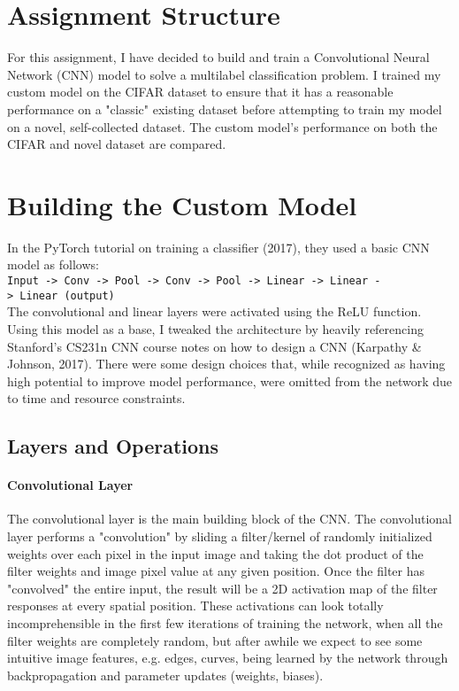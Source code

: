 \documentclass[11pt]{article}
\begin{document}
\newpage
    \section{Assignment Structure}\label{assignment-structure}

For this assignment, I have decided to build and train a Convolutional
Neural Network (CNN) model to solve a multilabel classification problem.
I trained my custom model on the CIFAR dataset to ensure that it has a
reasonable performance on a "classic" existing dataset before attempting
to train my model on a novel, self-collected dataset. The custom model's
performance on both the CIFAR and novel dataset are compared.

    \section{Building the Custom Model}\label{building-the-custom-model}

In the PyTorch tutorial on training a classifier (2017), they used a
basic CNN model as follows:\\

\texttt{Input\ -\textgreater{}\ Conv\ -\textgreater{}\ Pool\ -\textgreater{}\ Conv\ -\textgreater{}\ Pool\ -\textgreater{}\ Linear\ -\textgreater{}\ Linear\ -\textgreater{}\ Linear\ (output)}\\

The convolutional and linear layers were activated using the ReLU
function.\\

Using this model as a base, I tweaked the architecture by heavily
referencing Stanford's CS231n CNN course notes on how to design a CNN
(Karpathy \& Johnson, 2017). There were some design choices that, while
recognized as having high potential to improve model performance, were
omitted from the network due to time and resource constraints.

\subsection{Layers and Operations}\label{layers-and-operations}

\paragraph{Convolutional Layer}\label{convolutional-layer}

The convolutional layer is the main building block of the CNN. The
convolutional layer performs a "convolution" by sliding a filter/kernel
of randomly initialized weights over each pixel in the input image and
taking the dot product of the filter weights and image pixel value at
any given position. Once the filter has "convolved" the entire input,
the result will be a 2D activation map of the filter responses at every
spatial position. These activations can look totally incomprehensible in
the first few iterations of training the network, when all the filter
weights are completely random, but after awhile we expect to see some
intuitive image features, e.g. edges, curves, being learned by the
network through backpropagation and parameter updates (weights, biases).\\
\end{document}
